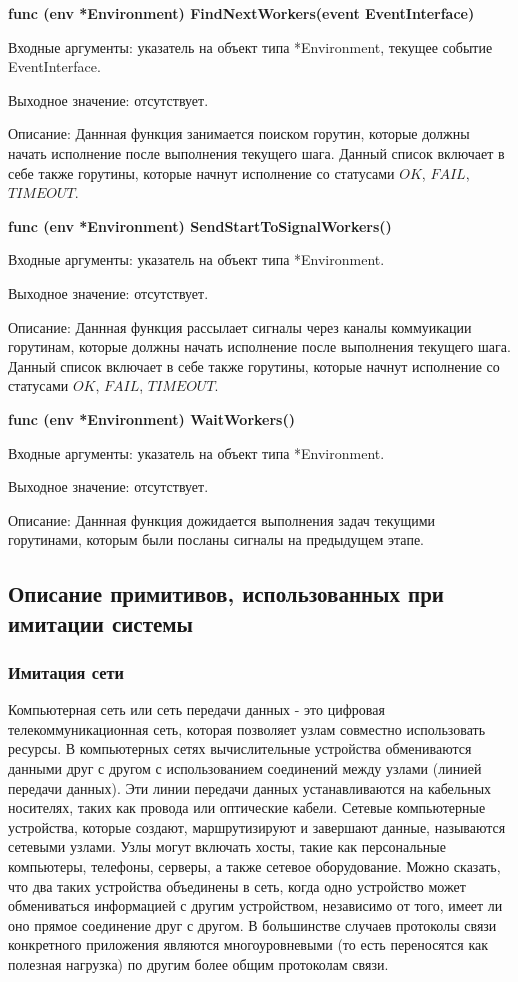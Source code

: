 \textbf{func (env *Environment) FindNextWorkers(event EventInterface)}

Входные аргументы: указатель на объект типа *Environment, текущее событие EventInterface.

Выходное значение: отсутствует. 

Описание: Даннная функция занимается поиском горутин, которые должны начать исполнение после выполнения текущего шага. Данный список включает в себе также горутины, которые начнут исполнение со статусами $OK$, $FAIL$, $TIMEOUT$.

\textbf{func (env *Environment) SendStartToSignalWorkers()}

Входные аргументы: указатель на объект типа *Environment.

Выходное значение: отсутствует. 

Описание: Даннная функция рассылает сигналы через каналы коммуикации горутинам, которые должны начать исполнение после выполнения текущего шага. Данный список включает в себе также горутины, которые начнут исполнение со статусами $OK$, $FAIL$, $TIMEOUT$.

\textbf{func (env *Environment) WaitWorkers() }

Входные аргументы: указатель на объект типа *Environment.

Выходное значение: отсутствует. 

Описание: Даннная функция дожидается выполнения задач текущими горутинами, которым были посланы сигналы на предыдущем этапе.



\subsection{Описание примитивов, использованных при имитации системы}

\subsubsection{Имитация сети}
\par 
Компьютерная сеть или сеть передачи данных - это цифровая телекоммуникационная сеть, которая позволяет узлам совместно использовать ресурсы. В компьютерных сетях вычислительные устройства обмениваются данными друг с другом с использованием соединений между узлами (линией передачи данных). Эти линии передачи данных устанавливаются на кабельных носителях, таких как провода или оптические кабели.
Сетевые компьютерные устройства, которые создают, маршрутизируют и завершают данные, называются сетевыми узлами. Узлы могут включать хосты, такие как персональные компьютеры, телефоны, серверы, а также сетевое оборудование. Можно сказать, что два таких устройства объединены в сеть, когда одно устройство может обмениваться информацией с другим устройством, независимо от того, имеет ли оно прямое соединение друг с другом. В большинстве случаев протоколы связи конкретного приложения являются многоуровневыми (то есть переносятся как полезная нагрузка) по другим более общим протоколам связи.

